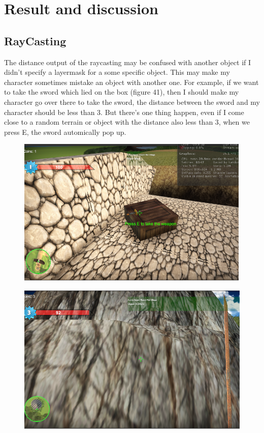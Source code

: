 \documentclass[a4paper, 13pt]{extarticle}
\begin{document}
{\section{Result and discussion}
\subsection{RayCasting} 
	The distance output of the raycasting may be confused with another object if I didn't specify a layermask for a some specific object. This may make my character sometimes mistake an object with another one. For example, if we want to take the sword which lied on the box (figure 41), then I should make my character go over there to take the sword, the distance between the sword and my character should be less than 3. But there's one thing happen, even if I come close to a random terrain or object with the distance also less than 3, when we press E, the sword automically pop up.
	\begin{figure}[h]
		\begin{minipage}{.5\textwidth}
			\centering
			\includegraphics[width=1\linewidth]{intructions/Take_weapon1.png}
			\label{fig:test39}
		\end{minipage}
		\begin{minipage}{.5\textwidth}
			\centering
			\includegraphics[width=1\linewidth]{intructions/Take_weapon2.png}

\end{minipage}
\end{figure}}
\end{document}

